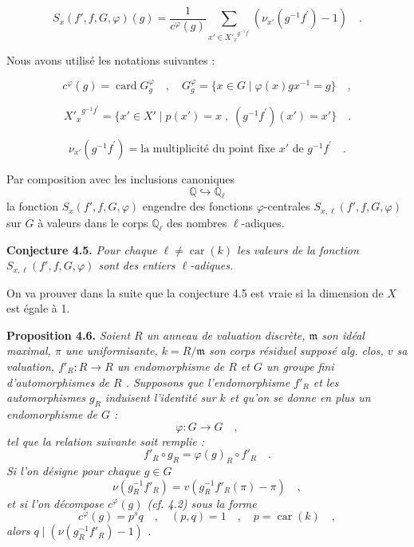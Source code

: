 \documentclass[11pt]{article}
\providecommand{\fm}{\mathfrak{m}}
\newcommand{\car}{\operatorname{car}}
\providecommand{\car}{\operatorname{car}}
\providecommand{\car}{\operatorname{car}}
\providecommand{\bQ}{\mathbb Q}
\providecommand{\fm}{\mathfrak m}
\providecommand{\card}{\operatorname{card}}
\providecommand{\car}{\operatorname{car}}
\begin{document}
\begin{equation}\tag{4.1}
S_x(f',f,G,\varphi)(g) = \frac{1}{c^\varphi(g)} \sum_{x' \in {X'_x}^{g^{-1}f^{\prime}}} (\nu_{x'}(g^{-1}f^{\prime}) - 1) \quad .
\end{equation}

Nous avons utilisé les notations suivantes :

\begin{equation}\tag{4.2}
c^\varphi(g) = \card G_g^\varphi \quad , \quad G_g^\varphi = \{ x \in G \mid \varphi(x)gx^{-1} = g \} \quad ,
\end{equation}

\begin{equation}\tag{4.3}
{X'_x}^{g^{-1}f^{\prime}} = \{ x' \in X' \mid p(x') = x \; , \; (g^{-1}f^{\prime})(x') = x' \} \quad .
\end{equation}

\begin{equation}\tag{4.4}
\nu_{x'}(g^{-1}f^{\prime}) = \text{la multiplicité du point fixe } x' \text{ de } g^{-1}f^{\prime} \quad .
\end{equation}

Par composition avec les inclusions canoniques
\[
\bQ \hookrightarrow \bQ_\ell
\]
la fonction $S_x(f',f,G,\varphi)$ engendre des fonctions $\varphi$-centrales $S_{x,\ell}(f',f,G,\varphi)$ sur $G$ à valeurs dans le corps $\bQ_\ell$ des nombres $\ell$-adiques.

\medskip
\noindent
\textbf{Conjecture 4.5.} \emph{Pour chaque $\ell \neq \car(k)$ les valeurs de la fonction $S_{x,\ell}(f',f,G,\varphi)$ sont des entiers $\ell$-adiques.}

\medskip

On va prouver dans la suite que la conjecture 4.5 est vraie si la dimension de $X$ est égale à 1.

\medskip
\noindent
\textbf{Proposition 4.6.} \emph{Soient $R$ un anneau de valuation discrète, $\fm$ son idéal maximal, $\pi$ une uniformisante, $k = R/\fm$ son corps résiduel supposé alg. clos, $v$ sa valuation, $f'_R : R \to R$ un endomorphisme de $R$ et $G$ un groupe fini d'automorphismes de $R$ . Supposons que l'endomorphisme $f'_R$ et les automorphismes $g_R$ induisent l'identité sur $k$ et qu'on se donne en plus un endomorphisme de $G$ :
\[
\varphi : G \longrightarrow G \quad ,
\]
tel que la relation suivante soit remplie :
\[
f'_R \circ g_R = \varphi(g)_R \circ f'_R \quad .
\]
Si l'on désigne pour chaque $g \in G$
\[
\nu(g_R^{-1}f'_R) = v(g_R^{-1}f'_R(\pi) - \pi) \quad ,
\]
et si l'on décompose $c^\varphi(g)$ (cf. 4.2) sous la forme
\[
c^\varphi(g) = p^s q \quad , \quad (p,q) = 1 \quad , \quad p = \car(k) \quad ,
\]
alors $q \mid (\nu(g_R^{-1}f'_R) - 1)$ .}
\end{document}
